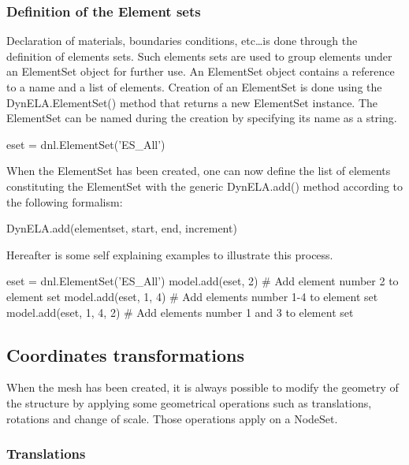 \subsubsection{Definition of the Element sets}

Declaration of materials, boundaries conditions, etc\ldots is done through the definition of elements sets. Such elements sets are used to group elements under an \textsf{ElementSet} object for further use. An \textsf{ElementSet} object contains a reference to a name and a list of elements. Creation of an \textsf{ElementSet} is done using the \textsf{DynELA.ElementSet()} method that returns a new \textsf{ElementSet} instance. The \textsf{ElementSet} can be named during the creation by specifying its name as a string.

\begin{PythonListing}
eset = dnl.ElementSet('ES_All')
\end{PythonListing}

When the \textsf{ElementSet} has been created, one can now define the list of elements constituting the \textsf{ElementSet} with the generic \textsf{DynELA.add()} method according to the following formalism:

\textsf{DynELA.add(elementset, start, end, increment)}

Hereafter is some self explaining examples to illustrate this process.

\begin{PythonListing}
eset = dnl.ElementSet('ES_All')
model.add(eset, 2)       # Add element number 2 to element set
model.add(eset, 1, 4)    # Add elements number 1-4 to element set
model.add(eset, 1, 4, 2) # Add elements number 1 and 3 to element set
\end{PythonListing}

\subsection{Coordinates transformations}

When the mesh has been created, it is always possible to modify the geometry of the structure by applying some geometrical operations such as translations, rotations and change of scale. Those operations apply on a \textsf{NodeSet}.

\subsubsection{Translations}

